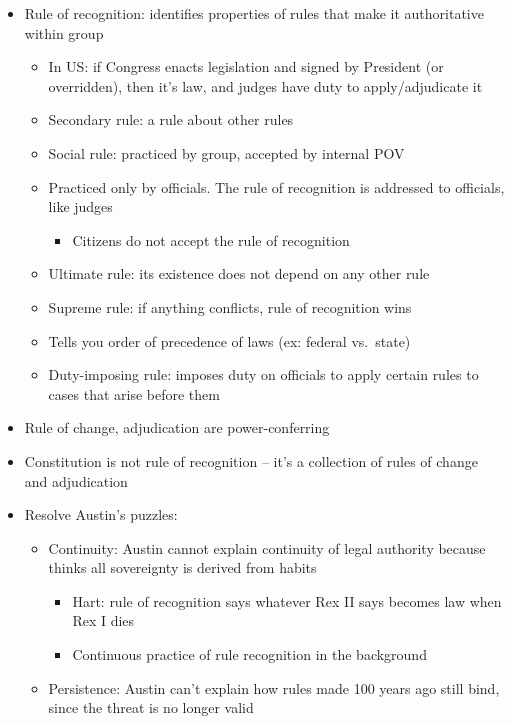 \begin{itemize}
\tightlist
\item
  Rule of recognition: identifies properties of rules that make it
  authoritative within group

  \begin{itemize}
  \tightlist
  \item
    In US: if Congress enacts legislation and signed by President (or
    overridden), then it's law, and judges have duty to apply/adjudicate
    it
  \item
    Secondary rule: a rule about other rules
  \item
    Social rule: practiced by group, accepted by internal POV
  \item
    Practiced only by officials. The rule of recognition is addressed to
    officials, like judges

    \begin{itemize}
    \tightlist
    \item
      Citizens do not accept the rule of recognition
    \end{itemize}
  \item
    Ultimate rule: its existence does not depend on any other rule
  \item
    Supreme rule: if anything conflicts, rule of recognition wins
  \item
    Tells you order of precedence of laws (ex: federal vs.~state)
  \item
    Duty-imposing rule: imposes duty on officials to apply certain rules
    to cases that arise before them
  \end{itemize}
\item
  Rule of change, adjudication are power-conferring
\item
  Constitution is not rule of recognition -- it's a collection of rules
  of change and adjudication
\item
  Resolve Austin's puzzles:

  \begin{itemize}
  \tightlist
  \item
    Continuity: Austin cannot explain continuity of legal authority
    because thinks all sovereignty is derived from habits

    \begin{itemize}
    \tightlist
    \item
      Hart: rule of recognition says whatever Rex II says becomes law
      when Rex I dies
    \item
      Continuous practice of rule recognition in the background
    \end{itemize}
  \item
    Persistence: Austin can't explain how rules made 100 years ago still
    bind, since the threat is no longer valid


\end{itemize}
\end{itemize}
